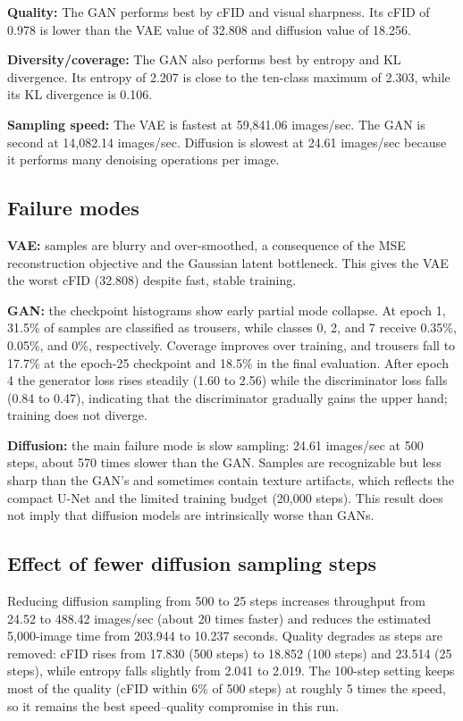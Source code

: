 \documentclass[11pt]{article}
\begin{document}
\textbf{Quality:} The GAN performs best by cFID and visual sharpness. Its cFID of 0.978 is lower than the VAE value of 32.808 and diffusion value of 18.256.

\textbf{Diversity/coverage:} The GAN also performs best by entropy and KL divergence. Its entropy of 2.207 is close to the ten-class maximum of 2.303, while its KL divergence is 0.106.

\textbf{Sampling speed:} The VAE is fastest at 59,841.06 images/sec. The GAN is second at 14,082.14 images/sec. Diffusion is slowest at 24.61 images/sec because it performs many denoising operations per image.

\subsection{Failure modes}

\textbf{VAE:} samples are blurry and over-smoothed, a consequence of the MSE reconstruction objective and the Gaussian latent bottleneck. This gives the VAE the worst cFID (32.808) despite fast, stable training.

\textbf{GAN:} the checkpoint histograms show early partial mode collapse. At epoch 1, 31.5\% of samples are classified as trousers, while classes 0, 2, and 7 receive 0.35\%, 0.05\%, and 0\%, respectively. Coverage improves over training, and trousers fall to 17.7\% at the epoch-25 checkpoint and 18.5\% in the final evaluation. After epoch 4 the generator loss rises steadily (1.60 to 2.56) while the discriminator loss falls (0.84 to 0.47), indicating that the discriminator gradually gains the upper hand; training does not diverge.

\textbf{Diffusion:} the main failure mode is slow sampling: 24.61 images/sec at 500 steps, about 570 times slower than the GAN. Samples are recognizable but less sharp than the GAN's and sometimes contain texture artifacts, which reflects the compact U-Net and the limited training budget (20,000 steps). This result does not imply that diffusion models are intrinsically worse than GANs.

\subsection{Effect of fewer diffusion sampling steps}

Reducing diffusion sampling from 500 to 25 steps increases throughput from 24.52 to 488.42 images/sec (about 20 times faster) and reduces the estimated 5,000-image time from 203.944 to 10.237 seconds. Quality degrades as steps are removed: cFID rises from 17.830 (500 steps) to 18.852 (100 steps) and 23.514 (25 steps), while entropy falls slightly from 2.041 to 2.019. The 100-step setting keeps most of the quality (cFID within 6\% of 500 steps) at roughly 5 times the speed, so it remains the best speed--quality compromise in this run.
\end{document}
